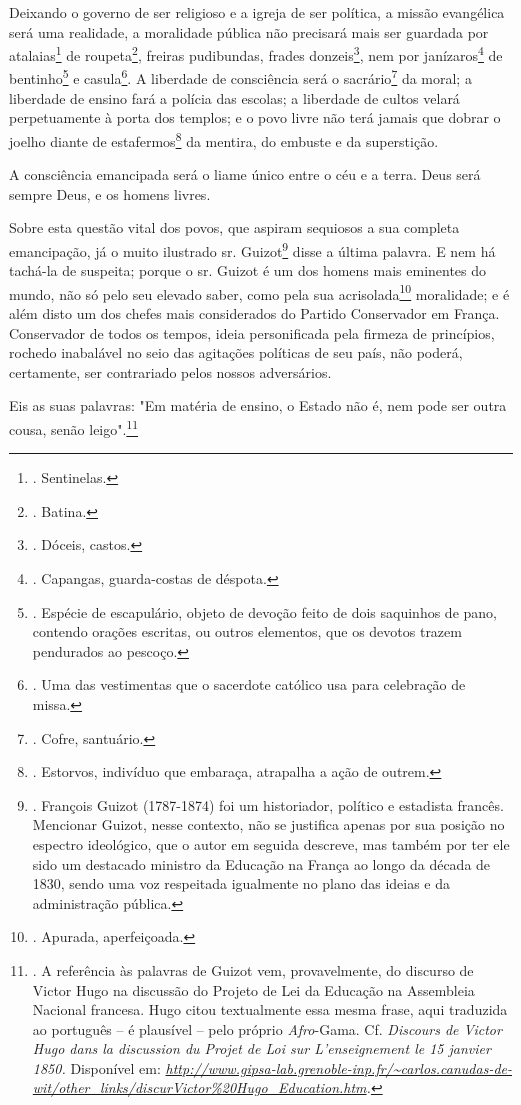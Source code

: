 Deixando o governo de ser religioso e a igreja de ser política, a missão
evangélica será uma realidade, a moralidade pública não precisará mais
ser guardada por atalaias\footnote{. Sentinelas.} de roupeta\footnote{.
  Batina.}, freiras pudibundas, frades donzeis\footnote{. Dóceis,
  castos.}, nem por janízaros\footnote{. Capangas, guarda-costas de
  déspota.} de bentinho\footnote{. Espécie de escapulário, objeto de
  devoção feito de dois saquinhos de pano, contendo orações escritas, ou
  outros elementos, que os devotos trazem pendurados ao pescoço.} e
casula\footnote{. Uma das vestimentas que o sacerdote católico usa para
  celebração de missa.}. A liberdade de consciência será o
sacrário\footnote{. Cofre, santuário.} da moral; a liberdade de ensino
fará a polícia das escolas; a liberdade de cultos velará perpetuamente à
porta dos templos; e o povo livre não terá jamais que dobrar o joelho
diante de estafermos\footnote{. Estorvos, indivíduo que embaraça,
  atrapalha a ação de outrem.} da mentira, do embuste e da superstição.

A consciência emancipada será o liame único entre o céu e a terra. Deus
será sempre Deus, e os homens livres.

Sobre esta questão vital dos povos, que aspiram sequiosos a sua completa
emancipação, já o muito ilustrado sr. Guizot\footnote{. François Guizot
  (1787-1874) foi um historiador, político e estadista francês.
  Mencionar Guizot, nesse contexto, não se justifica apenas por sua
  posição no espectro ideológico, que o autor em seguida descreve, mas
  também por ter ele sido um destacado ministro da Educação na França ao
  longo da década de 1830, sendo uma voz respeitada igualmente no plano
  das ideias e da administração pública.} disse a última palavra. E nem
há tachá-la de suspeita; porque o sr. Guizot é um dos homens mais
eminentes do mundo, não só pelo seu elevado saber, como pela sua
acrisolada\footnote{. Apurada, aperfeiçoada.} moralidade; e é além disto
um dos chefes mais considerados do Partido Conservador em França.
Conservador de todos os tempos, ideia personificada pela firmeza de
princípios, rochedo inabalável no seio das agitações políticas de seu
país, não poderá, certamente, ser contrariado pelos nossos adversários.

Eis as suas palavras: "Em matéria de ensino, o Estado não é, nem pode
ser outra cousa, senão leigo".\footnote{. A referência às palavras de
  Guizot vem, provavelmente, do discurso de Victor Hugo na discussão do
  Projeto de Lei da Educação na Assembleia Nacional francesa. Hugo citou
  textualmente essa mesma frase, aqui traduzida ao português -- é
  plausível -- pelo próprio \emph{Afro}-Gama. Cf. \emph{Discours de
  Victor Hugo dans la discussion du Projet de Loi sur L'enseignement le
  15 janvier 1850.} Disponível em:
  \emph{\url{http://www.gipsa-lab.grenoble-inp.fr/~carlos.canudas-de-wit/other_links/discurVictor\%20Hugo_Education.htm}.}}

